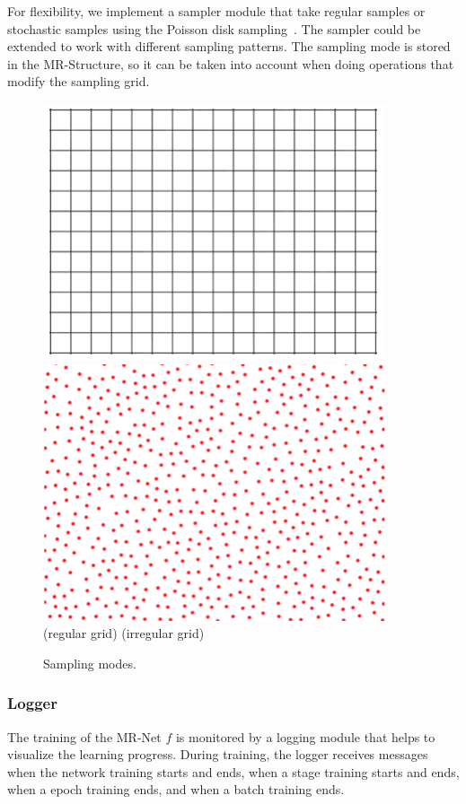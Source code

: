 For flexibility, we implement a sampler module that take regular samples or stochastic samples using the Poisson disk sampling~\cite{stochastic_cook, poisson_bridson}. 
The sampler could be extended to work with different sampling patterns. 
The sampling mode is stored in the MR-Structure, so it can be taken into account when doing operations that modify the sampling grid.

\begin{figure}[!h]
\centering
\includegraphics[width=0.45\linewidth]{img/ch4/regular.png}
\hfil
\includegraphics[width=0.45\linewidth]{img/ch4/poisson.png}
\\
{\small\hfil (regular grid) \hfil\hfil\hfil (irregular grid) \hfil}
\caption{Sampling modes.}
\label{f:sampling}
\end{figure}


\subsubsection{Logger}

The training of the MR-Net $f$ is monitored by a logging module that helps to visualize the learning progress. During training, the logger receives messages when the network training starts and ends, when a stage training starts and ends, when a epoch training ends, and when a batch training ends. 

